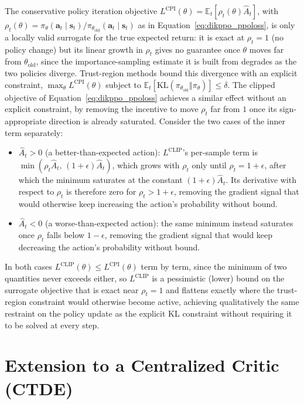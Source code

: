 The conservative policy iteration objective $L^{\text{CPI}}(\theta) = \mathbb{E}_t[\rho_t(\theta)\hat
A_t]$, with $\rho_t(\theta) = \pi_\theta(\mathbf{a}_t\mid\mathbf{s}_t)/\pi_{\theta_{\text{old}}}
(\mathbf{a}_t\mid\mathbf{s}_t)$ as in Equation~\eqref{eq:dikppo_ppoloss}, is only a locally valid
surrogate for the true expected return: it is exact at $\rho_t=1$ (no policy change) but its linear
growth in $\rho_t$ gives no guarantee once $\theta$ moves far from $\theta_{\text{old}}$, since the
importance-sampling estimate it is built from degrades as the two policies diverge. Trust-region
methods bound this divergence with an explicit constraint, $\max_\theta L^{\text{CPI}}(\theta)$
subject to $\mathbb{E}_t[\text{KL}(\pi_{\theta_{\text{old}}}\Vert\pi_\theta)] \leq \delta$. The
clipped objective of Equation~\eqref{eq:dikppo_ppoloss} achieves a similar effect without an explicit
constraint, by removing the incentive to move $\rho_t$ far from $1$ once its sign-appropriate
direction is already saturated. Consider the two cases of the inner term separately:
\begin{itemize}
    \item $\hat A_t > 0$ (a better-than-expected action): $L^{\text{CLIP}}$'s per-sample term is
    $\min\left(\rho_t\hat A_t,\, (1+\epsilon)\hat A_t\right)$, which grows with $\rho_t$ only until
    $\rho_t = 1+\epsilon$, after which the minimum saturates at the constant
    $(1+\epsilon)\hat A_t$. Its derivative with respect to $\rho_t$ is therefore zero for $\rho_t >
    1+\epsilon$, removing the gradient signal that would otherwise keep increasing the action's
    probability without bound.
    \item $\hat A_t < 0$ (a worse-than-expected action): the same minimum instead saturates once
    $\rho_t$ falls below $1-\epsilon$, removing the gradient signal that would keep decreasing the
    action's probability without bound.
\end{itemize}
In both cases $L^{\text{CLIP}}(\theta) \leq L^{\text{CPI}}(\theta)$ term by term, since the minimum of
two quantities never exceeds either, so $L^{\text{CLIP}}$ is a pessimistic (lower) bound on the
surrogate objective that is exact near $\rho_t = 1$ and flattens exactly where the trust-region
constraint would otherwise become active, achieving qualitatively the same restraint on the policy
update as the explicit KL constraint without requiring it to be solved at every step.

\section{Extension to a Centralized Critic (CTDE)}\label{sec:appE_ctde}

